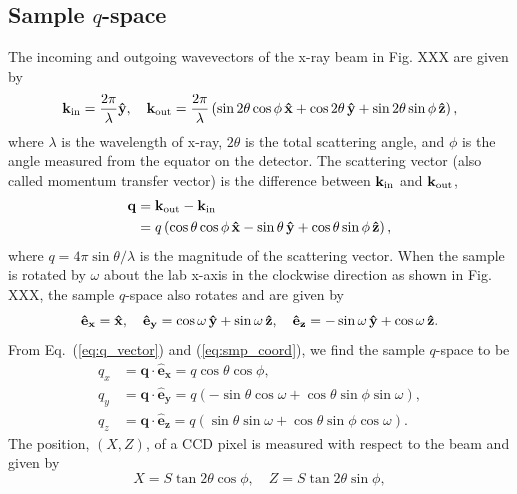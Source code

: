 \subsection{Sample $q$-space}
The incoming and outgoing wavevectors of the x-ray beam in Fig. XXX 
are given by
\begin{equation}
  \mathbf{k}_{\mathrm{in}} = \frac{2\pi}{\lambda} \mathbf{\hat{y}}, \quad
  \mathbf{k}_{\mathrm{out}} = 
    \frac{2\pi}{\lambda} \left( 
      \sin 2\theta \cos\phi \, \mathbf{\hat{x}}
      + \cos 2\theta \, \mathbf{\hat{y}}
      + \sin 2\theta \sin\phi \, \mathbf{\hat{z}} 
    \right),
\end{equation}
where $\lambda$ is the wavelength of x-ray, $2\theta$ is the total scattering
angle, and $\phi$ is the angle measured from the equator on the detector. 
The scattering vector (also called
momentum transfer vector) is
the difference between $\mathbf{k}_{\mathrm{in}}$ and $\mathbf{k}_{\mathrm{out}}$,
\begin{align}
  \mathbf{q} &= \mathbf{k}_{\mathrm{out}} - \mathbf{k}_{\mathrm{in}} \nonumber \\
             &= q \left( 
                  \cos\theta\cos\phi \, \mathbf{\hat{x}} - \sin\theta \, \mathbf{\hat{y}}
                  + \cos\theta\sin\phi \, \mathbf{\hat{z}}
                \right),
  \label{eq:q_vector}
\end{align}
where $q=4\pi\sin\theta/\lambda$ is the magnitude of the scattering vector. 
When the sample is rotated by $\omega$ about the lab x-axis in the clockwise 
direction as shown in Fig. XXX, the sample $q$-space also rotates and 
are given by  
\begin{equation}
  \mathbf{\hat{e}_x} = \mathbf{\hat{x}}, \quad
  \mathbf{\hat{e}_y} = \cos\omega\,\mathbf{\hat{y}} + \sin\omega\,\mathbf{\hat{z}}, \quad
  \mathbf{\hat{e}_z} = -\sin\omega\,\mathbf{\hat{y}} + \cos\omega\,\mathbf{\hat{z}}.
  \label{eq:smp_coord}
\end{equation}
From Eq.~(\ref{eq:q_vector}) and (\ref{eq:smp_coord}), we find the sample
$q$-space to be
\begin{align}
  q_x &= \mathbf{q}\cdot\mathbf{\hat{e}_x} 
       = q\cos\theta\cos\phi, 
       \nonumber\\
  q_y &= \mathbf{q}\cdot\mathbf{\hat{e}_y} 
       = q\left(-\sin\theta\cos\omega + \cos\theta\sin\phi\sin\omega\right), 
       \nonumber\\
  q_z &= \mathbf{q}\cdot\mathbf{\hat{e}_z} 
       = q\left(\sin\theta\sin\omega + \cos\theta\sin\phi\cos\omega\right).
       \label{eq:qxqyqz}
\end{align}
The position, $(X,Z)$, of a CCD pixel is measured with respect to the beam 
and given by
\begin{equation}
  X = S \tan 2\theta \cos\phi, \quad Z = S \tan 2\theta \sin\phi,
  \label{eq:XZ}
\end{equation} 
